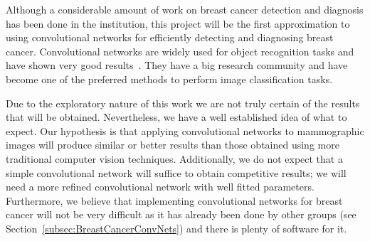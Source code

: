 Although a considerable amount of work on breast cancer detection and diagnosis has been done in the institution, this project will be the first approximation to using convolutional networks for efficiently detecting and diagnosing breast cancer. Convolutional networks are widely used for object recognition tasks and have shown very good results~\cite{Russakovsky2015, Taigman2014, Dieleman2015}. They have a big research community and have become one of the preferred methods to perform image classification tasks.%

Due to the exploratory nature of this work we are not truly certain of the results that will be obtained. Nevertheless, we have a well established idea of what to expect. Our hypothesis is that applying convolutional networks to mammographic images will produce similar or better results than those obtained using more traditional computer vision techniques. Additionally, we do not expect that a simple convolutional network will suffice to obtain competitive results; we will need a more refined convolutional network with well fitted parameters. Furthermore, we believe that implementing convolutional networks for breast cancer will not be very difficult as it has already been done by other groups (see Section~\ref{subsec:BreastCancerConvNets}) and there is plenty of software for it. 

